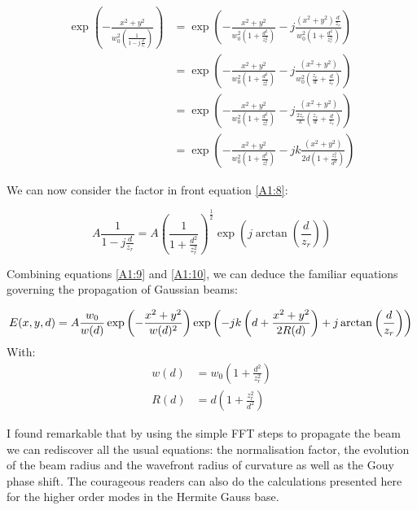 \begin{equation}
\begin{split}
\exp\left(- \frac{x^2 +  y^2}{w_0^2 \left(\frac{1}{1 - j \frac{d}{z_r}} \right) } \right) & = \exp \left(-\frac{x^2+y^2}{w_0^2\left(1 + \frac{d^2}{z_r^2}\right)}  -j \frac{(x^2+y^2)\frac{d}{z_r}}{w_0^2\left(1 + \frac{d^2}{z_r^2}\right)} \right)  \\
& = \exp \left(-\frac{x^2+y^2}{w_0^2\left(1 + \frac{d^2}{z_r^2}\right)} -j \frac{(x^2+y^2)}{w_0^2\left(\frac{z_r}{d} + \frac{d}{z_r}\right)}              \right)  \\
& = \exp \left(-\frac{x^2+y^2}{w_0^2\left(1 + \frac{d^2}{z_r^2}\right)} -j \frac{(x^2+y^2)}{\frac{2 z_r}{k}\left(\frac{z_r}{d} + \frac{d}{z_r}\right)}              \right)  \\
& = \exp \left(-\frac{x^2+y^2}{w_0^2\left(1 + \frac{d^2}{z_r^2}\right)} -j k\frac{(x^2+y^2)}{2 d\left(1 + \frac{z_r^2}{d^2}\right)}              \right)
\end{split}
\label{A1:9}
\end{equation}

We can now consider the factor in front equation \ref{A1:8}:

\begin{equation}
A \frac{1}{1 - j \frac{d}{z_r}} = A \left(\frac{1}{1 + \frac{d^2}{z_r^2}}\right)^\frac{1}{2} \exp\left(j \arctan\left(\frac{d}{z_r} \right)\right)
\label{A1:10}
\end{equation}

Combining equations \ref{A1:9} and \ref{A1:10}, we can deduce the familiar equations governing the propagation of Gaussian beams:

\begin{equation}
   E(x,y,d) = A \frac{w_0}{w(d)} \exp\left(- \frac{x^2 +  y^2}{w(d)^2} \right) \exp \left(-j k\left(d + \frac{x^2+y^2}{2 R(d)}\right) + j \arctan\left(\frac{d}{z_r} \right) \right) \\
\label{A1:11}
\end{equation}
With:
\begin{equation}
\begin{split}
w(d) & = w_0 \left( 1 + \frac{d^2}{z_r^2}  \right)\\
R(d) & = d\left(1 + \frac{z_r^2}{d^2}\right)
\end{split}
\label{A1:234}
\end{equation}

I found remarkable that by using the simple FFT steps to propagate the beam we can rediscover all the usual equations: the normalisation factor, the evolution of the beam radius and the wavefront radius of curvature as well as the Gouy phase shift. The courageous readers can also do the calculations presented here for the higher order modes in the Hermite Gauss base.
